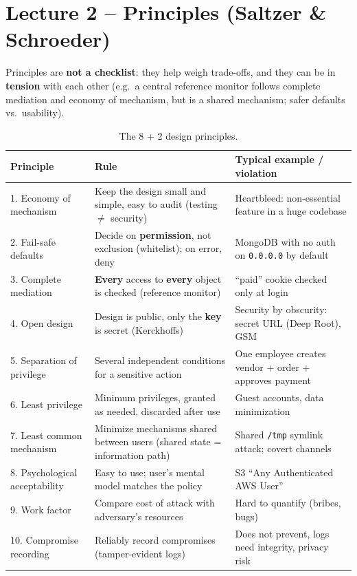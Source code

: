 \section{Lecture 2 -- Principles (Saltzer \& Schroeder)}

Principles are \textbf{not a checklist}: they help weigh trade-offs, and they can be in \textbf{tension} with each other (e.g.\ a central reference monitor follows complete mediation and economy of mechanism, but is a shared mechanism; safer defaults vs.\ usability).

\begin{table}[h]
\centering
\small
\begin{tabular}{@{}p{3.3cm}p{5.6cm}p{5.6cm}@{}}
\toprule
\textbf{Principle} & \textbf{Rule} & \textbf{Typical example / violation} \\
\midrule
1. Economy of mechanism & Keep the design small and simple, easy to audit (testing $\neq$ security) & Heartbleed: non-essential feature in a huge codebase \\[3pt]
2. Fail-safe defaults & Decide on \textbf{permission}, not exclusion (whitelist); on error, deny & MongoDB with no auth on \texttt{0.0.0.0} by default \\[3pt]
3. Complete mediation & \textbf{Every} access to \textbf{every} object is checked (reference monitor) & ``paid'' cookie checked only at login \\[3pt]
4. Open design & Design is public, only the \textbf{key} is secret (Kerckhoffs) & Security by obscurity: secret URL (Deep Root), GSM \\[3pt]
5. Separation of privilege & Several independent conditions for a sensitive action & One employee creates vendor + order + approves payment \\[3pt]
6. Least privilege & Minimum privileges, granted as needed, discarded after use & Guest accounts, data minimization \\[3pt]
7. Least common mechanism & Minimize mechanisms shared between users (shared state = information path) & Shared \texttt{/tmp} symlink attack; covert channels \\[3pt]
8. Psychological acceptability & Easy to use; user's mental model matches the policy & S3 ``Any Authenticated AWS User'' \\[3pt]
9. Work factor & Compare cost of attack with adversary's resources & Hard to quantify (bribes, bugs) \\[3pt]
10. Compromise recording & Reliably record compromises (tamper-evident logs) & Does not prevent, logs need integrity, privacy risk \\
\bottomrule
\end{tabular}
\caption{The 8 + 2 design principles.}
\end{table}


